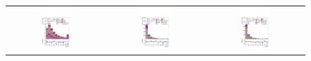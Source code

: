 %
\begin{figure}[H]
\centering
\begin{tabular}{@{}ccc@{}}
\includegraphics[page=1,width=0.33\textwidth]{figures/reg1l2tau1bnj_os.pdf} &
\includegraphics[page=1,width=0.33\textwidth]{figures/reg1l1tau1b1j_ss.pdf}&
\includegraphics[page=1,width=0.33\textwidth]{figures/reg1l1tau1b2j_ss.pdf}\\

\end{tabular}
\end{figure}
